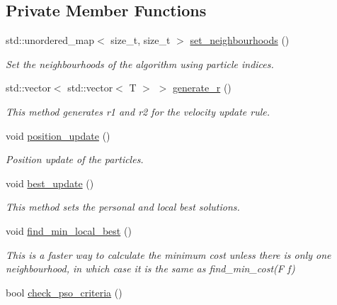 \subsection*{Private Member Functions}
\begin{DoxyCompactItemize}
\item 
std\+::unordered\+\_\+map$<$ size\+\_\+t, size\+\_\+t $>$ \hyperlink{classea_1_1_solver_3_01_p_s_os_00_01_t_00_01_f_00_01_c_01_4_acf9a10b2f3e095c365fa787c06709a3d}{set\+\_\+neighbourhoods} ()
\begin{DoxyCompactList}\small\item\em Set the neighbourhoods of the algorithm using particle indices. \end{DoxyCompactList}\item 
std\+::vector$<$ std\+::vector$<$ T $>$ $>$ \hyperlink{classea_1_1_solver_3_01_p_s_os_00_01_t_00_01_f_00_01_c_01_4_a01ea94eec2b6f05c62c9f83d725bb75b}{generate\+\_\+r} ()
\begin{DoxyCompactList}\small\item\em This method generates r1 and r2 for the velocity update rule. \end{DoxyCompactList}\item 
void \hyperlink{classea_1_1_solver_3_01_p_s_os_00_01_t_00_01_f_00_01_c_01_4_a91feb28b5a3b292da8eedb1f782d53c0}{position\+\_\+update} ()
\begin{DoxyCompactList}\small\item\em Position update of the particles. \end{DoxyCompactList}\item 
void \hyperlink{classea_1_1_solver_3_01_p_s_os_00_01_t_00_01_f_00_01_c_01_4_ab52c41eb3bea4aa9465ff254bee82990}{best\+\_\+update} ()
\begin{DoxyCompactList}\small\item\em This method sets the personal and local best solutions. \end{DoxyCompactList}\item 
void \hyperlink{classea_1_1_solver_3_01_p_s_os_00_01_t_00_01_f_00_01_c_01_4_a012b67607139916c790167fefc1f38e7}{find\+\_\+min\+\_\+local\+\_\+best} ()
\begin{DoxyCompactList}\small\item\em This is a faster way to calculate the minimum cost unless there is only one neighbourhood, in which case it is the same as find\+\_\+min\+\_\+cost(\+F f) \end{DoxyCompactList}\item 
bool \hyperlink{classea_1_1_solver_3_01_p_s_os_00_01_t_00_01_f_00_01_c_01_4_afd7a166bcdc0730431ca9406f0d0e030}{check\+\_\+pso\+\_\+criteria} ()

\end{DoxyCompactItemize}
